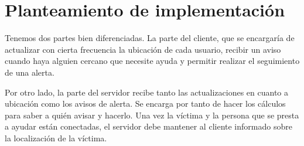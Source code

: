 \section{Planteamiento de implementación}

Tenemos dos partes bien diferenciadas. La parte del cliente, que se encargaría de actualizar con cierta frecuencia
la ubicación de cada usuario, recibir un aviso cuando haya alguien cercano que necesite ayuda y permitir realizar el seguimiento de una alerta.

Por otro lado, la parte del servidor recibe tanto las actualizaciones en cuanto a ubicación como 
los avisos de alerta. Se encarga por tanto de hacer los cálculos para saber a quién avisar y hacerlo. 
Una vez la víctima y la persona que se presta a ayudar están conectadas, el servidor debe mantener
al cliente informado sobre la localización de la víctima.